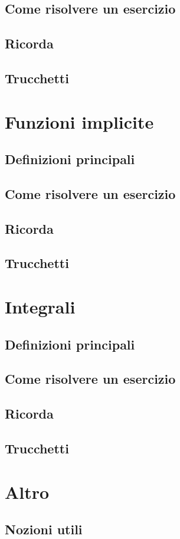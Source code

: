 \documentclass[a4paper,10pt]{book}
\begin{document}
\subsection{Come risolvere un esercizio}

\subsection{Ricorda}
\subsection{Trucchetti}

\section{Funzioni implicite}
\subsection{Definizioni principali}

\subsection{Come risolvere un esercizio}

\subsection{Ricorda}
\subsection{Trucchetti}
\section{Integrali}
\subsection{Definizioni principali}

\subsection{Come risolvere un esercizio}

\subsection{Ricorda}
\subsection{Trucchetti}
\section{Altro}

\subsection{Nozioni utili}
\end{document}
